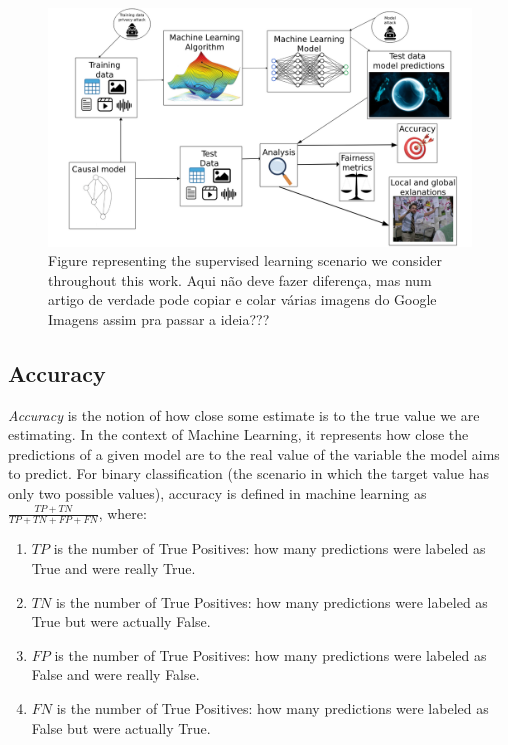 \begin{figure}[ht]
\centering
\includegraphics[width=\textwidth]{EverythingEAAO}
\caption{Figure representing the supervised learning scenario we consider throughout this work.{\color{orange} Aqui não deve fazer diferença, mas num artigo de verdade pode copiar e colar várias imagens do Google Imagens assim pra passar a ideia???}}\label{fig:EEAAO}
\end{figure}

\subsection{Accuracy}

\emph{Accuracy} is the notion of how close some estimate is to the true value we are estimating. In the context of Machine Learning, it represents how close the predictions of a given model are to the real value of the variable the model aims to predict. For binary classification (the scenario in which the target value has only two possible values), accuracy is defined in machine learning as $\frac{TP+TN}{TP+TN+FP+FN}$, where:

\begin{enumerate}
\item $TP$ is the number of True Positives: how many predictions were labeled as True and were really True.
\item $TN$ is the number of True Positives: how many predictions were labeled as True but were actually False.
\item $FP$ is the number of True Positives: how many predictions were labeled as False and were really False.
\item $FN$ is the number of True Positives: how many predictions were labeled as False but were actually True.
\end{enumerate}

